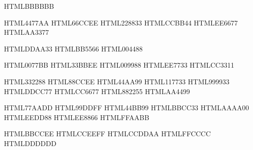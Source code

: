 \definecolor{TolGray}      {HTML}{BBBBBB}

\definecolor{TolBriBlue}   {HTML}{4477AA}
\definecolor{TolBriCyan}   {HTML}{66CCEE}
\definecolor{TolBriGreen}  {HTML}{228833}
\definecolor{TolBriYellow} {HTML}{CCBB44}
\definecolor{TolBriRed}    {HTML}{EE6677}
\definecolor{TolBriPurple} {HTML}{AA3377}

\definecolor{TolHCYellow}  {HTML}{DDAA33}
\definecolor{TolHCRed}     {HTML}{BB5566}
\definecolor{TolHCBlue}    {HTML}{004488}

\definecolor{TolVibBlue}   {HTML}{0077BB}
\definecolor{TolVibCyan}   {HTML}{33BBEE}
\definecolor{TolVibTeal}   {HTML}{009988}
\definecolor{TolVibOrange} {HTML}{EE7733}
\definecolor{TolVibRed}    {HTML}{CC3311}

\definecolor{TolMutIndigo} {HTML}{332288}
\definecolor{TolMutCyan}   {HTML}{88CCEE}
\definecolor{TolMutTeal}   {HTML}{44AA99}
\definecolor{TolMutGreen}  {HTML}{117733}
\definecolor{TolMutOlive}  {HTML}{999933}
\definecolor{TolMutSand}   {HTML}{DDCC77}
\definecolor{TolMutRose}   {HTML}{CC6677}
\definecolor{TolMutWine}   {HTML}{882255}
\definecolor{TolMutPurple} {HTML}{AA4499}

\definecolor{TolLigBlue}   {HTML}{77AADD}
\definecolor{TolLigCyan}   {HTML}{99DDFF}
\definecolor{TolLigMint}   {HTML}{44BB99}
\definecolor{TolLigPear}   {HTML}{BBCC33}
\definecolor{TolLigOlive}  {HTML}{AAAA00}
\definecolor{TolLigYellow} {HTML}{EEDD88}
\definecolor{TolLigOrange} {HTML}{EE8866}
\definecolor{TolLigPink}   {HTML}{FFAABB}

\definecolor{TolPaleBlue}  {HTML}{BBCCEE}
\definecolor{TolPaleCyan}  {HTML}{CCEEFF}
\definecolor{TolPaleGreen} {HTML}{CCDDAA}
\definecolor{TolPaleRed}   {HTML}{FFCCCC}
\definecolor{TolPaleGray}  {HTML}{DDDDDD}